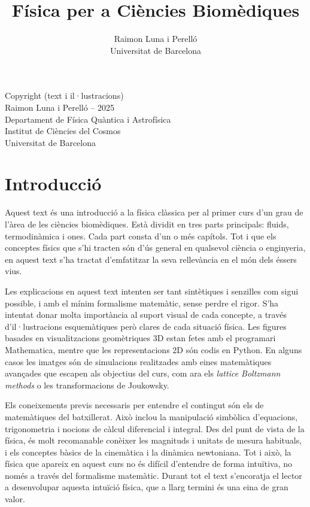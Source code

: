 \documentclass[12pt]{book}
\title{Física per a Ciències Biomèdiques}
\author{Raimon Luna i Perelló \\ Universitat de Barcelona}
\begin{document}
\maketitle

\null\vfill
\noindent
Copyright (text i il·lustracions)\\
Raimon Luna i Perelló -- 2025 \\
Departament de Física Quàntica i Astrofísica\\
Institut de Ciències del Cosmos\\
Universitat de Barcelona
\newpage

\tableofcontents

\chapter{Introducció}

Aquest text és una introducció a la física clàssica per al primer curs d'un grau de l'àrea de les ciències biomèdiques. Està dividit en tres parts principals: fluids, termodinàmica i ones. Cada part consta d'un o més capítols. Tot i que els conceptes físics que s'hi tracten són d'ús general en qualsevol ciència o enginyeria, en aquest text s'ha tractat d'emfatitzar la seva rellevància en el món dels éssers vius.

Les explicacions en aquest text intenten ser tant sintètiques i senzilles com sigui possible, i amb el mínim formalisme matemàtic, sense perdre el rigor. S'ha intentat donar molta importància al suport visual de cada concepte, a través d'il·lustracions esquemàtiques però clares de cada situació física. Les figures basades en visualitzacions geomètriques 3D estan fetes amb el programari Mathematica, mentre que les representacions 2D són codis en Python. En alguns casos les imatges són de simulacions realitzades amb eines matemàtiques avançades que escapen als objectius del curs, com ara els {\it lattice Boltzmann methods} o les transformacions de Joukowsky.

Els coneixements previs necessaris per entendre el contingut són els de matemàtiques del batxillerat. Això inclou la manipulació simbòlica d'equacions, trigonometria i nocions de càlcul diferencial i integral. Des del punt de vista de la física, és molt recomanable conèixer les magnituds i unitats de mesura habituals, i els conceptes bàsics de la cinemàtica i la dinàmica newtoniana. Tot i això, la física que apareix en aquest curs no és difícil d'entendre de forma intuïtiva, no només a través del formalisme matemàtic. Durant tot el text s'encoratja el lector a desenvolupar aquesta intuïció física, que a llarg termini és una eina de gran valor.
\end{document}
